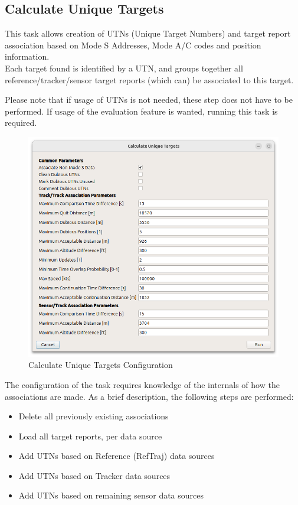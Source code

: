 \subsection{Calculate Unique Targets}
\label{sec:ui_associate_tr}

This task allows creation of UTNs (Unique Target Numbers) and target report association based on Mode S Addresses, Mode A/C codes and position information. \\

Each target found is identified by a UTN, and groups together all reference/tracker/sensor target reports (which can) be associated to this target.

Please note that if usage of UTNs is not needed, these step does not have to be performed. If usage of the evaluation feature is wanted, running this task is required. \\

\begin{figure}[H]
  \center
    \includegraphics[width=16cm]{figures/tr_association_config.png}
  \caption{Calculate Unique Targets Configuration}
\end{figure}

The configuration of the task requires knowledge of the internals of how the associations are made. As a brief description, the following steps are performed:

\begin{itemize}
\item Delete all previously existing associations
\item Load all target reports, per data source
\item Add UTNs based on Reference (RefTraj) data sources
\item Add UTNs based on Tracker data sources
\item Add UTNs based on remaining sensor data sources
\end{itemize}
\ \\

